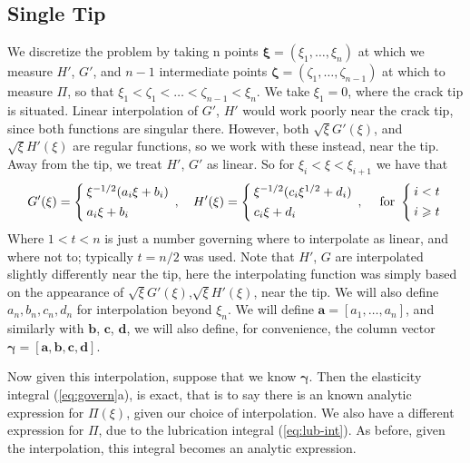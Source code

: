 \documentclass{jfm}
\begin{document}
\subsection{Single Tip}
We discretize the problem by taking n points $\boldsymbol{\xi} = (\xi_1, \dots
,\xi_n)$ at which we measure $H'$, $G'$, and $n-1$ intermediate points 
$\boldsymbol{\zeta} = (\zeta_1, \dots , \zeta_{n-1})$ at which to measure
$\Pi$, so that $\xi_1 < \zeta_1 < \dots < \zeta_{n-1} < \xi_n$. We take
$\xi_1 = 0$, where the crack tip is situated.
Linear interpolation of $G'$, $H'$ would work poorly near the crack tip, since
both functions are singular there. However, both $\sqrt{\xi}G'(\xi)$, and
$\sqrt{\xi}H'(\xi)$ are regular functions, so we work with these instead,
near the tip. Away from the tip, we treat $H'$, $G'$ as linear. So for 
$\xi_{i} < \xi < \xi_{i+1}$ we have that
\begin{equation}
\setlength{\arraycolsep}{2pt}
G'(\xi) = \left\{ \begin{array}{l}  
\xi^{-1/2}(a_i \xi + b_i) \\[4pt]
a_i \xi + b_i
 \end{array}\right., \quad
H'(\xi) = \left\{ \begin{array}{l}  
\xi^{-1/2}(c_i \xi^{1/2} + d_i) \\[4pt]
c_i \xi + d_i
 \end{array}\right. , \quad
\; \mbox{for\ } \left\{ \begin{array}{l}  
i<t\\[4pt]
i\geq t
\end{array}\right.
\end{equation}
Where $1 < t < n$ is just a number governing where to interpolate as linear, and
where not to; typically $t = n/2$ was used. Note that $H'$, $G$ are interpolated
slightly differently near the tip, here the interpolating function was simply 
based on the appearance of $\sqrt{\xi}G'(\xi)$,$\sqrt{\xi}H'(\xi)$, near the 
tip. We will also define $a_n,b_n,c_n,d_n$ for interpolation beyond $\xi_n$.
We will define $\boldsymbol{a} = [a_1,\dots ,a_n]$, and similarly with 
$\boldsymbol{b}$, $\boldsymbol{c}$, $\boldsymbol{d}$, we will also define,
for convenience, the column vector $\boldsymbol{\gamma}=[\boldsymbol{a},
\boldsymbol{b},\boldsymbol{c},\boldsymbol{d}]$.

Now given this interpolation, suppose that we know $\boldsymbol{\gamma}$.
Then the elasticity integral (\ref{eq:govern}a), is exact, 
that is to say there is an known analytic expression for $\Pi(\xi)$, given 
our choice of interpolation.
We also have a different expression for $\Pi$, due to the lubrication integral
(\ref{eq:lub-int}).
As before, given the interpolation, this integral becomes an analytic
expression.
\end{document}
